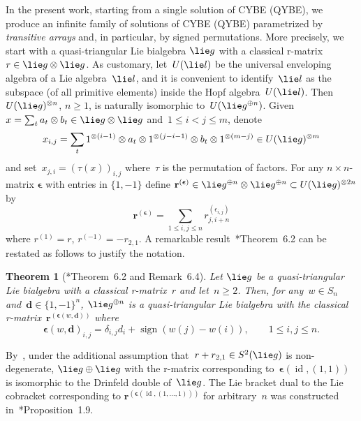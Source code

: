 \documentclass[12pt, reqno]{amsart}
\newtheorem{theorem}{Theorem}[section]
\theoremstyle{definition}
\numberwithin{equation}{section}
\newcommand{\tensor}{\otimes}
\DeclareMathOperator{\id}{id}
\DeclareMathOperator{\sign}{sign}
\newcommand{\sgna}[1]{\boldsymbol{\epsilon}(#1)}
\begin{document}
In the present work, starting from 
a single solution of CYBE (QYBE), we produce an infinite family of solutions of CYBE (QYBE) parametrized by {\em transitive arrays} and, in particular, by signed permutations. More precisely, we start with a quasi-triangular Lie
bialgebra $\lie g$ with a classical r-matrix~$r\in \lie g\tensor \lie g$.
As customary, let~$U(\lie l)$ be the universal enveloping algebra of a Lie algebra~$\lie l$, and it is convenient to identify~$\lie l$ as the subspace (of all primitive elements)
inside the Hopf algebra~$U(\lie l)$.
Then~$U(\lie g)^{\tensor n}$, $n\ge 1$, is naturally isomorphic to~$U(\lie g^{\oplus n})$. Given~$x=\sum_t a_t\tensor b_t\in \lie g\tensor \lie g$ and~$1\le i<j\le m$, denote
\begin{equation}\label{eq:copy in tensor}
x_{i,j}=\sum_t
1^{\tensor (i-1)}\tensor a_t\tensor 1^{\tensor(j-i-1)}\tensor b_t\tensor 1^{\tensor (m-j)}\in U(\lie g)^{\tensor m}
\end{equation}
and set~$x_{j,i}=(\tau(x))_{i,j}$ where~$\tau$ is the permutation of factors. 
For 
any $n\times n$-matrix $\boldsymbol\epsilon $ with entries in $\{1,-1\}$
define 
$\mathbf r^{(\boldsymbol\epsilon)}\in 
\lie g^{\oplus n}\tensor 
\lie g^{\oplus n}\subset U(\lie g)^{\tensor 2n}$
by 
\begin{equation}\label{eq:r c gen}
\mathbf r^{(\boldsymbol\epsilon)}=\sum_{1\le i,j\le n} r_{j,i+n}^{(\epsilon_{i,j})}
\end{equation}
where $r^{(1)}=r$, $r^{(-1)}=-r_{2,1}$.
A remarkable result~\cite{LuMou}*{Theorem~6.2} can
be restated as follows to justify the notation.
\begin{theorem}[\cite{LuMou}*{Theorem~6.2 and Remark~6.4}]\label{thm:thm 1}
Let $\lie g$
be a quasi-triangular Lie bialgebra with a classical r-matrix~$r$ and let~$n\ge 2$. Then,
for any~$w\in S_n$ and~$\boldsymbol d\in\{1,-1\}^n$,
$\lie g^{\oplus n}$ is a quasi-triangular Lie bialgebra with the classical r-matrix~$\mathbf r^{(\boldsymbol\epsilon(w,\boldsymbol d))}$ where 
\begin{equation}\label{eq:eps w alpha defn}
\boldsymbol\epsilon(w,\boldsymbol d)_{i,j}=\delta_{i,j}d_i+\sign(w(j)-w(i)),
\qquad 1\le i,j\le n.
\end{equation}
\end{theorem}
By~\cite{RSTS}, under the additional assumption that~$r+r_{2,1}\in S^2(\lie g)$ is non-degenerate, 
$\lie g\oplus\lie g$ with
the r-matrix corresponding to~$\sgna{\id,(1,1)}$
is isomorphic to the Drinfeld double of~$\lie g$.
The Lie bracket dual to the Lie cobracket
corresponding to $\mathbf r^{(\sgna{\id,(1,\dots,1)})}$
for arbitrary~$n$ was constructed in~\cite{EK-III}*{Proposition~1.9}.
\end{document}

